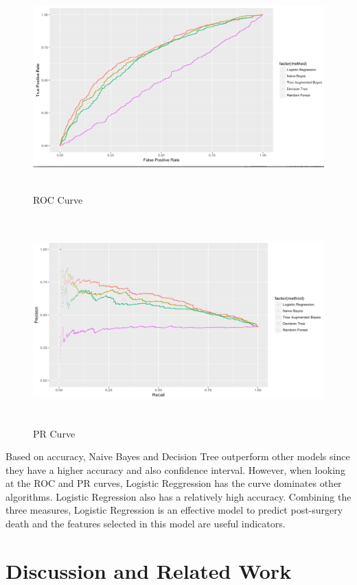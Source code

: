 \documentclass[twoside,11pt]{article}
\begin{document}
\begin{figure}[htbp]
  \centering 
  \includegraphics[height=8cm, width=15cm]{fig9} 
  \caption{ROC Curve}
  \label{fig9} 
\end{figure}

\begin{figure}[htbp]
  \centering 
  \includegraphics[height=8cm, width=15cm]{fig10} 
  \caption{PR Curve}
  \label{fig10} 
\end{figure}

Based on accuracy, Naive Bayes and Decision Tree outperform other models since they have a higher accuracy and also confidence interval. However, when looking at the ROC and PR curves, Logistic Reggression has the curve dominates other algorithms. Logistic Regression also has a relatively high accuracy. Combining the three measures, Logistic Regression is an effective model to predict post-surgery death and the features selected in this model are useful indicators.

\section{Discussion and Related Work} 
\end{document}

